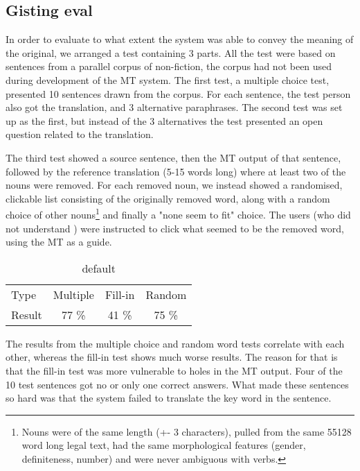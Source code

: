 \subsection{Gisting eval}
  
In order to evaluate to what extent the system was able to convey the
meaning of the original, we arranged a test containing 3 parts. All
the test were based on sentences from a parallel corpus of
non-fiction, the corpus had not been used during development of the MT
system. The first test, a multiple choice test, presented 10 sentences
drawn from the corpus. For each sentence, the test person also got the
translation, and 3 alternative paraphrases. The second test was set up
as the first, but instead of the 3 alternatives the test presented an
open question related to the translation.

The third test showed a \sme{} source sentence, then the MT output of
that sentence, followed by the reference translation (5-15 words long)
where at least two of the nouns were removed. For each removed noun,
we instead showed a randomised, clickable list consisting of the
originally removed word, along with a random choice of other
nouns\footnote{Nouns were of the same length (+- 3 characters), pulled
  from the same 55128 word long legal text, had the same morphological
  features (gender, definiteness, number) and were never ambiguous
  with verbs.} and finally a "none seem to fit" choice. The users (who
did not understand \sme{}) were instructed to click what seemed to be
the removed word, using the MT as a guide.

\begin{table}[htdp]
\caption{default}
\begin{center}
\begin{tabular}{lccc}
Type & Multiple & Fill-in & Random \\
Result & 77 \% & 41 \% & 75 \% \\
\end{tabular}
\end{center}
\label{eval}
\end{table}%



The results from the multiple choice and random word tests correlate with each other, whereas the fill-in test shows much worse results. The reason for that is that the fill-in test was more vulnerable to holes in the MT output. Four of the 10 test sentences got no or only one correct answers. What made these sentences so hard was that the system failed to translate the key word in the sentence.

